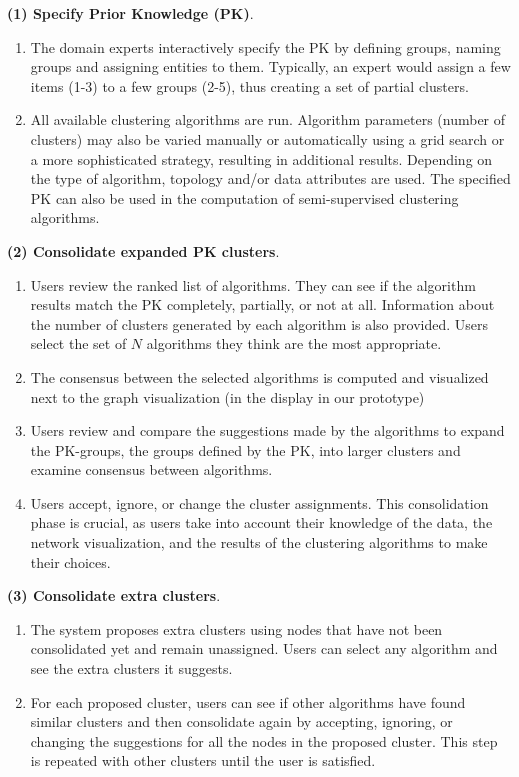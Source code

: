 \noindent \textbf{(1) Specify Prior Knowledge (PK)}.
\begin{enumerate}[left=.3em,nosep,label={\arabic*}.]
\item The domain experts interactively specify the PK by defining  groups, \ie naming groups and assigning entities to them.
Typically, an expert would assign a few items (1-3) to a few groups (2-5), thus creating a set of partial clusters.
\item All available clustering algorithms are run. Algorithm parameters (\eg number of clusters) may also be varied manually or automatically using a grid search or a more sophisticated strategy, resulting in additional results. Depending on the type of algorithm, topology and/or data attributes are used. The specified PK can also be used in the computation of semi-supervised clustering algorithms.
\end{enumerate}

\noindent \textbf{(2) Consolidate expanded PK clusters}.
\begin{enumerate}[left=.3em,nosep,label={\arabic*}.,start=3]
\item Users review the ranked list of algorithms. They can see if the algorithm results match the PK completely, partially, or not at all. Information about the number of clusters generated by each algorithm is also provided.  Users select the set of $N$ algorithms they think are the most appropriate.
\item The consensus between the selected algorithms is computed and visualized next to the graph visualization  (in the \paovis display in our prototype)
\item Users review and compare the suggestions made by the algorithms to expand the PK-groups, \ie the groups defined by the PK, into larger clusters and examine consensus between algorithms.
\item Users accept, ignore, or change the cluster assignments. This consolidation phase is crucial, as users take into account their knowledge of the data, the network visualization, and the results of the clustering algorithms to make their choices.
\end{enumerate}

\noindent \textbf{(3) Consolidate extra clusters}.
\begin{enumerate}[left=.3em,nosep,label={\arabic*}.,start=7,itemindent=0pt]
\item The system proposes extra clusters using nodes that have not been consolidated yet and remain unassigned. Users can select any algorithm and see the extra clusters it suggests.
\item For each proposed cluster, users can see if other algorithms have found similar clusters and then consolidate again by accepting, ignoring, or changing the suggestions for all the nodes in the proposed cluster. This step is repeated with other clusters until the user is satisfied.
\end{enumerate}

